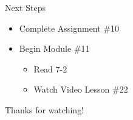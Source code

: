 \documentclass[t, aspectratio=169]{beamer}
\newcommand{\?}{\stackrel{?}{=}}
\begin{document}
	\begin{frame}{Next Steps}
		\begin{itemize}
			\item Complete Assignment \#10
			\item Begin Module \#11 \begin{itemize}
				\item Read 7-2
				\item Watch Video Lesson \#22
			\end{itemize}
		\end{itemize}
		
		\vfill
		
		Thanks for watching!
	\end{frame}
	
\end{document}
